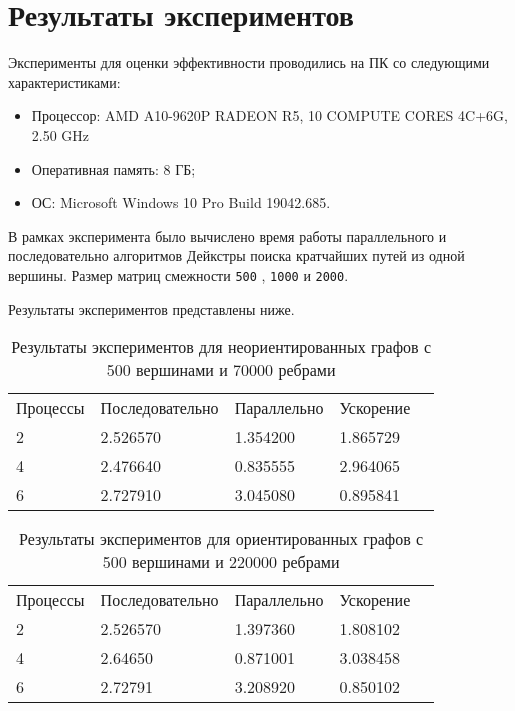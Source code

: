 \documentclass{report}
\begin{document}
\section*{Результаты экспериментов}
Эксперименты для оценки эффективности проводились на ПК со следующими характеристиками:

\begin{itemize}
\item Процессор: AMD A10-9620P RADEON R5, 10 COMPUTE CORES 4C+6G, 2.50 GHz
\item Оперативная память: 8 ГБ;
\item ОС: Microsoft Windows 10 Pro Build 19042.685.
\end{itemize}

\par В рамках эксперимента было вычислено время работы параллельного и последовательно алгоритмов Дейкстры поиска кратчайших путей из одной вершины. Размер матриц смежности \verb|500| , \verb|1000| и \verb|2000|.
\par Результаты экспериментов представлены ниже.

\begin{table}[!h]
\caption{Результаты экспериментов для неориентированных графов с 500 вершинами и 70000 ребрами}
\centering
\begin{tabular}{lllll}
Процессы & Последовательно & Параллельно & Ускорение  \\
2        & 2.526570            & 1.354200       & 1.865729       \\
4        & 2.476640            & 0.835555       & 2.964065       \\
6        & 2.727910            & 3.045080       & 0.895841
\end{tabular}
\end{table}

\begin{table}[!h]
\caption{Результаты экспериментов для ориентированных графов с 500 вершинами и 220000 ребрами}
\centering
\begin{tabular}{lllll}
Процессы & Последовательно & Параллельно & Ускорение            \\
2        & 2.526570            & 1.397360        & 1.808102     \\
4        & 2.64650            & 0.871001        & 3.038458      \\
6        & 2.72791            & 3.208920        & 0.850102
\end{tabular}
\end{table}
\end{document}
